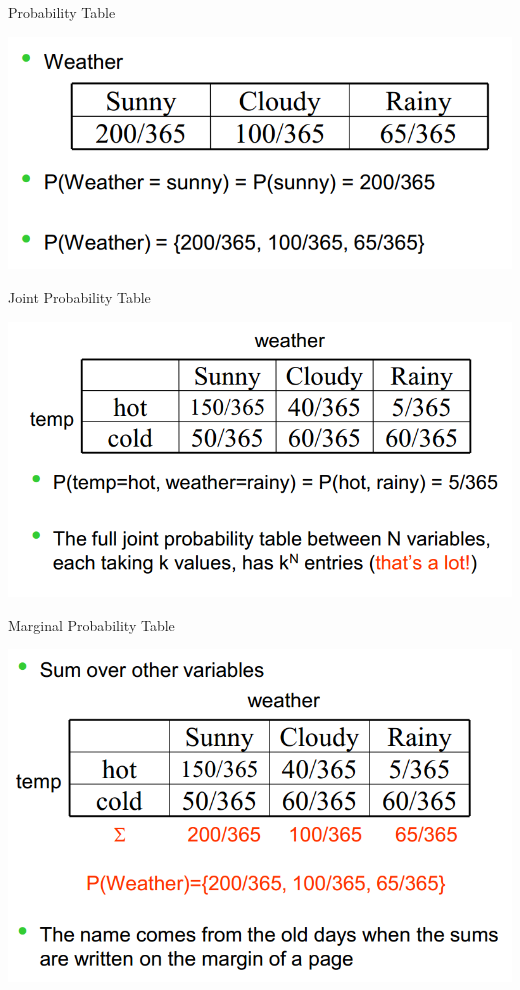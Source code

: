 \documentclass{beamer}
\begin{document}
\begin{frame}{Probability Table}
    \begin{center}
        \includegraphics[scale=0.3]{probTbl.png}
    \end{center}
\end{frame}
\begin{frame}{Joint Probability Table}
    \begin{center}
        \includegraphics[scale=0.3]{jointProbTbl.png}
    \end{center}
\end{frame}
\begin{frame}{Marginal Probability Table}
    \begin{center}
        \includegraphics[scale=0.3]{marginalProbTbl1.png}
    \end{center}
\end{frame}
\end{document}
